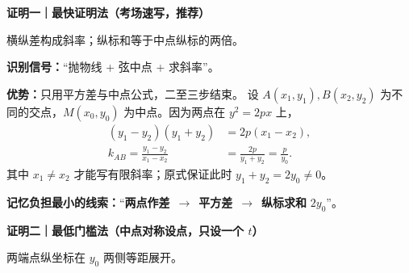\begin{proofbox}
\par\medskip
\begin{minipage}{\linewidth}
\par\medskip
\begin{minipage}{\linewidth}
\noindent
\textbf{\textcolor{CProof}{证明一｜最快证明法（考场速写，推荐）}}\par\nobreak\smallskip
\par
\begin{minipage}{\linewidth}
\begin{center}

\par\small 横纵差构成斜率；纵标和等于中点纵标的两倍。
\end{center}
\end{minipage}\par
\end{minipage}
\par

\par

\end{minipage}


\par\noindent\textbf{识别信号：}“抛物线 + 弦中点 + 求斜率”。
\par\noindent\textbf{优势：}只用平方差与中点公式，二至三步结束。
设 $A(x_1,y_1),B(x_2,y_2)$ 为不同的交点，$M(x_0,y_0)$ 为中点。因为两点在 $y^2=2px$ 上，
\[
\begin{aligned}
 (y_1-y_2)(y_1+y_2)&=2p(x_1-x_2),\\
 k_{AB}=\frac{y_1-y_2}{x_1-x_2}
 &=\frac{2p}{y_1+y_2}
 =\boxed{\frac{p}{y_0}}.
\end{aligned}
\]
其中 $x_1\ne x_2$ 才能写有限斜率；原式保证此时 $y_1+y_2=2y_0\ne0$。
\par\smallskip
\par\noindent\textbf{记忆负担最小的线索：}“\textbf{两点作差}\ $\to$\ \textbf{平方差}\ $\to$\ \textbf{纵标求和} $2y_0$”。
\par\medskip
\begin{minipage}{\linewidth}
\par\medskip
\begin{minipage}{\linewidth}
\noindent
\textbf{\textcolor{CProof}{证明二｜最低门槛法（中点对称设点，只设一个 $t$）}}\par\nobreak\smallskip
\par
\begin{minipage}{\linewidth}
\begin{center}

\par\small 两端点纵坐标在 $y_0$ 两侧等距展开。
\end{center}
\end{minipage}\par
\end{minipage}
\par


\end{minipage}
\end{proofbox}
